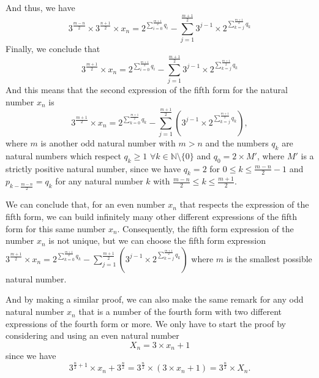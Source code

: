 \documentclass[11pt,a4paper]{article}
\newcommand{\N}{\mathbb{N}}
\newcommand{\Pf}[4]{2^{\sum_{#4=0}^{#1}#3_{#4}}-\sum_{j=1}^{#2}\left(3^{j-1}\times 2^{\sum_{#4=j}^{#1}#3_{#4}}\right)}
\theoremstyle{definition}
\begin{document}
And thus, we have
\begin{equation}
3^{\frac{m-n}{2}}\times 3^{\frac{n+1}{2}}\times x_n=2^{\sum_{i=0}^{\frac{m+1}{2}}q_i}-\sum_{j=1}^{\frac{m+1}{2}}3^{j-1}\times 2^{\sum_{k=j}^{\frac{m+1}{2}}q_k}
\end{equation}
Finally, we conclude that
\begin{equation}
3^{\frac{m+1}{2}}\times x_n=2^{\sum_{i=0}^{\frac{m+1}{2}}q_i}-\sum_{j=1}^{\frac{m+1}{2}}3^{j-1}\times 2^{\sum_{k=j}^{\frac{m+1}{2}}q_k}
\end{equation}
And this means that the second expression of the fifth form for the natural number $x_n$ is
\begin{equation}
3^{\frac{m+1}{2}}\times x_n=\Pf{\frac{m+1}{2}}{\frac{m+1}{2}}{q}{k},
\end{equation}
where $m$ is another odd natural number with $m>n$ and the numbers $q_k$ are natural
numbers which respect $q_k\ge 1$ $\forall k\in\N\setminus\{0\}$ and $q_0=2\times M'$, where
$M'$ is a strictly positive natural number, since we have $q_k=2$ for
$0\le k\le\frac{m-n}{2}-1$ and $p_{k-\frac{m-n}{2}}=q_k$ for any natural number $k$ with
$\frac{m-n}{2}\le k\le\frac{m+1}{2}$.

We can conclude that, for an even number $x_n$ that respects the expression of the fifth
form, we can build infinitely many other different expressions of the fifth form for this
same number $x_n$. Consequently, the fifth form expression of the number $x_n$ is not
unique, but we can choose the fifth form expression
$3^{\frac{m+1}{2}}\times x_n=\Pf{\frac{m+1}{2}}{\frac{m+1}{2}}{q}{k}$ where $m$ is the
smallest possible natural number.

And by making a similar proof, we can also make the same remark for any odd natural number
$x_n$ that is a number of the fourth form with two different expressions of the fourth
form or more. We only have to start the proof by considering and using an even natural
number
\begin{equation}
X_n=3\times x_n+1
\end{equation}
since we have
\begin{equation}
3^{\frac n2+1}\times x_n+3^{\frac n2}=3^{\frac n2}\times(3\times x_n+1)=3^{\frac n2}\times X_n.
\end{equation}

\end{document}
